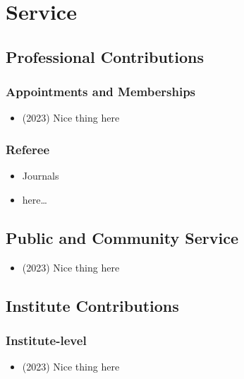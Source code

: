 \section{Service}
\begin{adjustwidth}{2em}{0pt}

\subsection{Professional Contributions}

\subsubsection{Appointments and Memberships}

\begin{itemize}
    \item (2023) Nice thing here 
\end{itemize}

\subsubsection{Referee}

\begin{itemize}
    \item Journals 
    \item here\dots
\end{itemize}

\subsection{Public and Community Service}

\begin{itemize}
    \item (2023) Nice thing here 
\end{itemize}

\subsection{Institute Contributions}

\subsubsection{Institute-level}

\begin{itemize}
    \item (2023) Nice thing here 
\end{itemize}


\end{adjustwidth}
